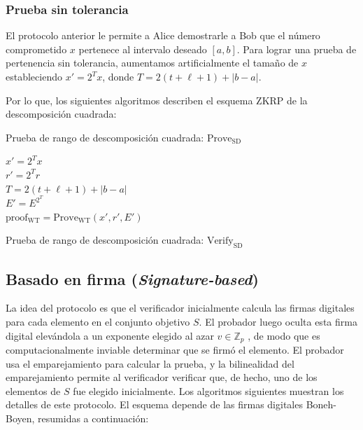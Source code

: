 \subsubsection{Prueba sin tolerancia}

El protocolo anterior le permite a Alice demostrarle a Bob que el número comprometido $x$ pertenece al intervalo deseado $[a, b]$. Para lograr una prueba de pertenencia sin tolerancia, aumentamos artificialmente el tamaño de $x$ estableciendo $x' = 2^{T}x$, donde $T = 2(t + \ell + 1) + |b - a|$.

Por lo que, los siguientes algoritmos describen el esquema ZKRP de la descomposición cuadrada:

\begin{minipage}{0.9\textwidth}
    \begin{algorithm}[H]
        \caption{Prueba de rango de descomposición cuadrada: $\operatorname{Prove_{SD}}$}

        $x' = 2^{T}x$ \\
        $r' = 2^{T}r$ \\
        $T = 2(t + \ell + 1) + |b - a|$ \\
        $E' = E^{2^{T}}$ \\
        $\operatorname{proof_{WT}} = \operatorname{Prove_{WT}}(x', r', E')$
        
    \end{algorithm}
\end{minipage}

\begin{minipage}{0.9\textwidth}
    \begin{algorithm}[H]
        \caption{Prueba de rango de descomposición cuadrada: $\operatorname{Verify_{SD}}$}
    \end{algorithm}
\end{minipage}


\subsection{Basado en firma (\emph{Signature-based})}

La idea del protocolo es que el verificador inicialmente calcula las firmas digitales para cada elemento en el conjunto objetivo $S$. El probador luego oculta esta firma digital elevándola a un exponente elegido al azar $v \in \mathbb{Z}_{p}$ , de modo que es computacionalmente inviable determinar que se firmó el elemento. El probador usa el emparejamiento para calcular la prueba, y la bilinealidad del emparejamiento permite al verificador verificar que, de hecho, uno de los elementos de $S$ fue elegido inicialmente. Los algoritmos siguientes muestran los detalles de este protocolo. El esquema depende de las firmas digitales Boneh-Boyen, resumidas a continuación:

